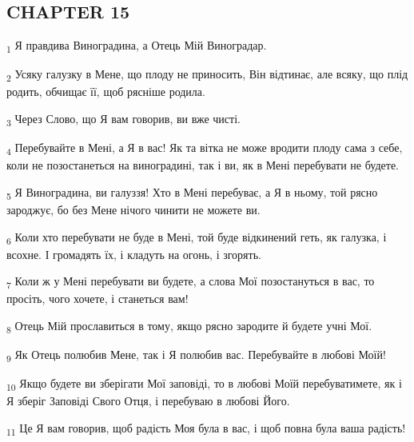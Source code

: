\subsection{CHAPTER 15}
\begin{tcolorbox}
\textsubscript{1} Я правдива Виноградина, а Отець Мій Виноградар.
\end{tcolorbox}
\begin{tcolorbox}
\textsubscript{2} Усяку галузку в Мене, що плоду не приносить, Він відтинає, але всяку, що плід родить, обчищає її, щоб рясніше родила.
\end{tcolorbox}
\begin{tcolorbox}
\textsubscript{3} Через Слово, що Я вам говорив, ви вже чисті.
\end{tcolorbox}
\begin{tcolorbox}
\textsubscript{4} Перебувайте в Мені, а Я в вас! Як та вітка не може вродити плоду сама з себе, коли не позостанеться на виноградині, так і ви, як в Мені перебувати не будете.
\end{tcolorbox}
\begin{tcolorbox}
\textsubscript{5} Я Виноградина, ви галуззя! Хто в Мені перебуває, а Я в ньому, той рясно зароджує, бо без Мене нічого чинити не можете ви.
\end{tcolorbox}
\begin{tcolorbox}
\textsubscript{6} Коли хто перебувати не буде в Мені, той буде відкинений геть, як галузка, і всохне. І громадять їх, і кладуть на огонь, і згорять.
\end{tcolorbox}
\begin{tcolorbox}
\textsubscript{7} Коли ж у Мені перебувати ви будете, а слова Мої позостануться в вас, то просіть, чого хочете, і станеться вам!
\end{tcolorbox}
\begin{tcolorbox}
\textsubscript{8} Отець Мій прославиться в тому, якщо рясно зародите й будете учні Мої.
\end{tcolorbox}
\begin{tcolorbox}
\textsubscript{9} Як Отець полюбив Мене, так і Я полюбив вас. Перебувайте в любові Моїй!
\end{tcolorbox}
\begin{tcolorbox}
\textsubscript{10} Якщо будете ви зберігати Мої заповіді, то в любові Моїй перебуватимете, як і Я зберіг Заповіді Свого Отця, і перебуваю в любові Його.
\end{tcolorbox}
\begin{tcolorbox}
\textsubscript{11} Це Я вам говорив, щоб радість Моя була в вас, і щоб повна була ваша радість!
\end{tcolorbox}
